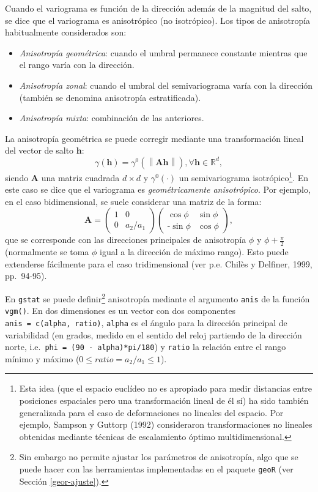 \documentclass[
  spanish,
]{book}
\providecommand{\tightlist}{%
  \setlength{\itemsep}{0pt}\setlength{\parskip}{0pt}}
\theoremstyle{break}
\theoremstyle{definition}
\theoremstyle{definition}
\theoremstyle{definition}
\theoremstyle{definition}
\theoremstyle{remark}
\begin{document}
Cuando el variograma es función de la dirección además de la magnitud del salto, se dice que el variograma es anisotrópico (no isotrópico).
Los tipos de anisotropía habitualmente considerados son:

\begin{itemize}
\tightlist
\item
  \emph{Anisotropía geométrica}: cuando el umbral permanece constante mientras que el rango varía con la dirección.
\item
  \emph{Anisotropía zonal}: cuando el umbral del semivariograma varía con la dirección (también se denomina anisotropía estratificada).
\item
  \emph{Anisotropía mixta}: combinación de las anteriores.
\end{itemize}

La anisotropía geométrica se puede corregir mediante una transformación lineal del vector de salto \(\mathbf{h}\):
\[\gamma(\mathbf{h})=\gamma^{0} \left( \left\| \mathbf{A}\mathbf{h}\right\| \right) ,\forall \mathbf{h}\in \mathbb{R}^{d},\]
siendo \(\mathbf{A}\) una matriz cuadrada \(d\times d\) y \(\gamma^{0} (\cdot)\) un semivariograma isotrópico\footnote{Esta idea (que el espacio euclídeo no es apropiado para medir distancias entre posiciones espaciales pero una transformación lineal de él sí) ha sido también generalizada para el caso de deformaciones no lineales del espacio. Por ejemplo, Sampson y Guttorp (1992) consideraron transformaciones no lineales obtenidas mediante técnicas de escalamiento óptimo multidimensional.}.
En este caso se dice que el variograma es \emph{geométricamente anisotrópico}.
Por ejemplo, en el caso bidimensional, se suele considerar una matriz de la forma:
\[\mathbf{A}=\left( 
\begin{array}{cc}
1  & 0 \\
0 & a_2/a_1 
\end{array}
\right) \left( 
\begin{array}{cc}
\cos \phi  & \sin\phi  \\
\text{-} \sin\phi  & \cos \phi 
\end{array}
\right),\]
que se corresponde con las direcciones principales de anisotropía \(\phi\) y \(\phi + \frac{\pi }{\text{2}}\) (normalmente se toma \(\phi\) igual a la dirección de máximo rango).
Esto puede extenderse fácilmente para el caso tridimensional (ver p.e. Chilès y Delfiner, 1999, pp.~94-95).

En \texttt{gstat} se puede definir\footnote{Sin embargo no permite ajustar los parámetros de anisotropía, algo que se puede hacer con las herramientas implementadas en el paquete \texttt{geoR} (ver Sección \ref{geor-ajuste}).} anisotropía mediante el argumento \texttt{anis} de la función \texttt{vgm()}.
En dos dimensiones es un vector con dos componentes \texttt{anis\ =\ c(alpha,\ ratio)}, \texttt{alpha} es el ángulo para la dirección principal de variabilidad (en grados, medido en el sentido del reloj partiendo de la dirección norte, i.e.~\texttt{phi\ =\ (90\ -\ alpha)*pi/180}) y \texttt{ratio} la relación entre el rango mínimo y máximo (\(0 \leq ratio = a_2/a_1 \leq 1\)).
\end{document}
